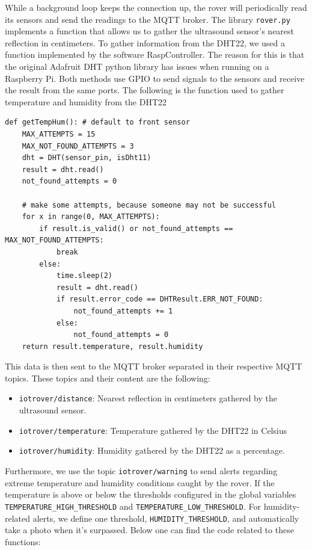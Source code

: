 While a background loop keeps the connection up, the rover will periodically read its sensors and send the readings to the MQTT broker. The library \lstinline|rover.py| implements a function that allows us to gather the ultrasound sensor's nearest reflection in centimeters. To gather information from the DHT22, we used a function implemented by the software RaspController. The reason for this is that the original Adafruit DHT python library has issues when running on a Raspberry Pi. Both methods use GPIO to send signals to the sensors and receive the result from the same ports. The following is the function used to gather temperature and humidity from the DHT22

\begin{lstlisting}[style=courier12]
def getTempHum(): # default to front sensor
    MAX_ATTEMPTS = 15
    MAX_NOT_FOUND_ATTEMPTS = 3
    dht = DHT(sensor_pin, isDht11)
    result = dht.read()
    not_found_attempts = 0
    
    # make some attempts, because someone may not be successful
    for x in range(0, MAX_ATTEMPTS):
        if result.is_valid() or not_found_attempts == MAX_NOT_FOUND_ATTEMPTS:
            break
        else:
            time.sleep(2)
            result = dht.read()
            if result.error_code == DHTResult.ERR_NOT_FOUND:
                not_found_attempts += 1
            else:
                not_found_attempts = 0
    return result.temperature, result.humidity
\end{lstlisting}

This data is then sent to the MQTT broker separated in their respective MQTT topics. These topics and their content are the following:
\begin{itemize}
    \item \lstinline|iotrover/distance|: Nearest reflection in centimeters gathered by the ultrasound sensor.
    \item \lstinline|iotrover/temperature|: Temperature gathered by the DHT22 in Celsius
    \item \lstinline|iotrover/humidity|: Humidity gathered by the DHT22 as a percentage.
\end{itemize}

Furthermore, we use the topic \lstinline|iotrover/warning| to send alerts regarding extreme temperature and humidity conditions caught by the rover. If the temperature is above or below the thresholds configured in the global variables  \lstinline|TEMPERATURE_HIGH_THRESHOLD| \newline and \lstinline|TEMPERATURE_LOW_THRESHOLD|. For humidity-related alerts, we define one threshold, \lstinline|HUMIDITY_THRESHOLD|, and automatically take a photo when it's surpassed. Below one can find the code related to these functions:

